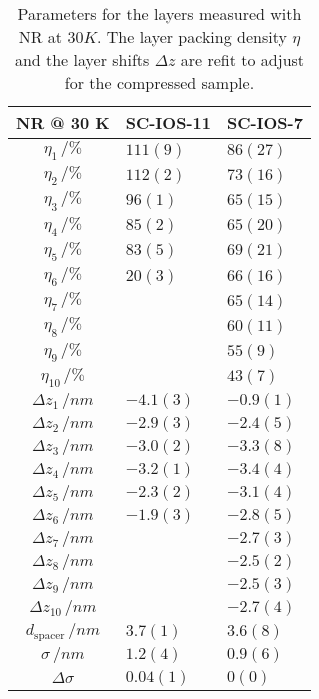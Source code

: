 \documentclass[\main/dresen_thesis.tex]{subfiles}
\begin{document}
  \begin{table}[!htbp]
    \centering
    \caption{\label{tab:looselyPackedNP:layers:reflectivity30K}Parameters for the layers measured with NR at $30 \unit{K}$. The layer packing density $\eta$ and the layer shifts $\Delta z$ are refit to adjust for the compressed sample.}
    \begin{tabular}{ c | l | l}
      \rule{0pt}{2ex} \textbf{NR @ 30 K}  & \textbf{SC-IOS-11} & \textbf{SC-IOS-7} \\
      \hline
       $\eta_1     \, / \unit{\%}$      & $111(9)$   & $86(27)$\\
       $\eta_2     \, / \unit{\%}$      & $112(2)$  & $73(16)$\\
       $\eta_3     \, / \unit{\%}$      & $96(1)$   & $65(15)$\\
       $\eta_4     \, / \unit{\%}$      & $85(2)$   & $65(20)$\\
       $\eta_5     \, / \unit{\%}$      & $83(5)$   & $69(21)$\\
       $\eta_6     \, / \unit{\%}$      & $20(3)$   & $66(16)$\\
       $\eta_7     \, / \unit{\%}$      &           & $65(14)$\\
       $\eta_8     \, / \unit{\%}$      &           & $60(11)$\\
       $\eta_9     \, / \unit{\%}$      &           & $55(9)$\\
       $\eta_{10}     \, / \unit{\%}$   &           & $43(7)$\\
       \hline
       $\Delta z_1 \, / \unit{nm} $     & $-4.1(3)$ & $-0.9(1)$\\
       $\Delta z_2 \, / \unit{nm} $     & $-2.9(3)$ & $-2.4(5)$\\
       $\Delta z_3 \, / \unit{nm} $     & $-3.0(2)$ & $-3.3(8)$\\
       $\Delta z_4 \, / \unit{nm} $     & $-3.2(1)$ & $-3.4(4)$\\
       $\Delta z_5 \, / \unit{nm} $     & $-2.3(2)$ & $-3.1(4)$\\
       $\Delta z_6 \, / \unit{nm} $     & $-1.9(3)$ & $-2.8(5)$\\
       $\Delta z_7 \, / \unit{nm} $     &           & $-2.7(3)$\\
       $\Delta z_8 \, / \unit{nm} $     &           & $-2.5(2)$\\
       $\Delta z_9 \, / \unit{nm} $     &           & $-2.5(3)$\\
       $\Delta z_{10} \, / \unit{nm} $  &           & $-2.7(4)$\\
       \hline
       $d_\mathrm{spacer}   \, / \unit{nm} $ & $3.7(1)$  & $3.6(8)$\\
       $\sigma     \, / \unit{nm} $          & $1.2(4)$  & $0.9(6)$\\
       $\Delta \sigma$                       & $0.04(1)$& $0(0)$\\
       \hline
    \end{tabular}
  \end{table}
\end{document}
